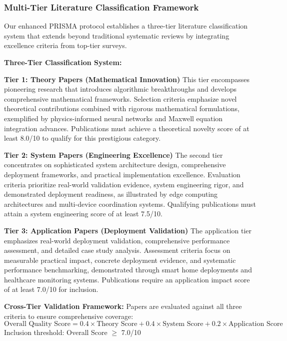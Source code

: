 \documentclass[journal]{IEEEtran}
\begin{document}
\subsubsection{Multi-Tier Literature Classification Framework}

Our enhanced PRISMA protocol establishes a three-tier literature classification system that extends beyond traditional systematic reviews by integrating excellence criteria from top-tier surveys.

\textbf{Three-Tier Classification System:}

\textbf{Tier 1: Theory Papers (Mathematical Innovation)}
This tier encompasses pioneering research that introduces algorithmic breakthroughs and develops comprehensive mathematical frameworks. Selection criteria emphasize novel theoretical contributions combined with rigorous mathematical formulations, exemplified by physics-informed neural networks and Maxwell equation integration advances. Publications must achieve a theoretical novelty score of at least 8.0/10 to qualify for this prestigious category.

\textbf{Tier 2: System Papers (Engineering Excellence)}
The second tier concentrates on sophisticated system architecture design, comprehensive deployment frameworks, and practical implementation excellence. Evaluation criteria prioritize real-world validation evidence, system engineering rigor, and demonstrated deployment readiness, as illustrated by edge computing architectures and multi-device coordination systems. Qualifying publications must attain a system engineering score of at least 7.5/10.

\textbf{Tier 3: Application Papers (Deployment Validation)}
The application tier emphasizes real-world deployment validation, comprehensive performance assessment, and detailed case study analysis. Assessment criteria focus on measurable practical impact, concrete deployment evidence, and systematic performance benchmarking, demonstrated through smart home deployments and healthcare monitoring systems. Publications require an application impact score of at least 7.0/10 for inclusion.

\textbf{Cross-Tier Validation Framework:}
Papers are evaluated against all three criteria to ensure comprehensive coverage:
\begin{equation}
\text{Overall Quality Score} = 0.4 \times \text{Theory Score} + 0.4 \times \text{System Score} + 0.2 \times \text{Application Score}
\label{eq:quality_score}
\end{equation}
Inclusion threshold: Overall Score $\geq$ 7.0/10
\end{document}
